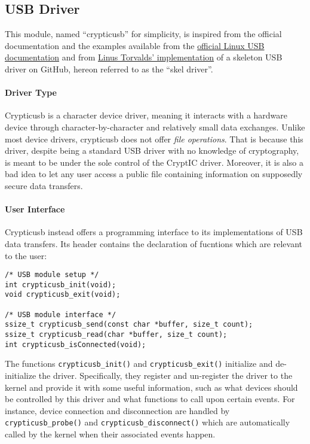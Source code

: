 \subsection{USB Driver}
This module, named ``crypticusb'' for simplicity, is inspired from the official documentation and the examples available from the \href{http://www.linux-usb.org/}{official Linux USB documentation} and from \href{https://github.com/torvalds/linux/blob/master/drivers/usb/usb-skeleton.c}{Linus Torvalds' implementation} of a skeleton USB driver on GitHub, hereon referred to as the ``skel driver''.

\paragraph{Driver Type} Crypticusb is a character device driver, meaning it interacts with a hardware device through character-by-character and relatively small data exchanges. Unlike most device drivers, crypticusb does not offer \textit{file operations}. That is because this driver, despite being a standard USB driver with no knowledge of cryptography, is meant to be under the sole control of the CryptIC driver. Moreover, it is also a bad idea to let any user access a public file containing information on supposedly secure data transfers.

\paragraph{User Interface} Crypticusb instead offers a programming interface to its implementations of USB data transfers. Its header contains the declaration of fucntions which are relevant to the user:
\begin{lstlisting}
/* USB module setup */
int crypticusb_init(void);
void crypticusb_exit(void);

/* USB module interface */
ssize_t crypticusb_send(const char *buffer, size_t count);
ssize_t crypticusb_read(char *buffer, size_t count);
int crypticusb_isConnected(void);
\end{lstlisting}
The functions \texttt{crypticusb\_init()} and \texttt{crypticusb\_exit()} initialize and de-initialize the driver. Specifically, they register and un-register the driver to the kernel and provide it with some useful information, such as what devices should be controlled by this driver and what functions to call upon certain events. For instance, device connection and disconnection are handled by \texttt{crypticusb\_probe()} and \texttt{crypticusb\_disconnect()} which are automatically called by the kernel when their associated events happen. \\

